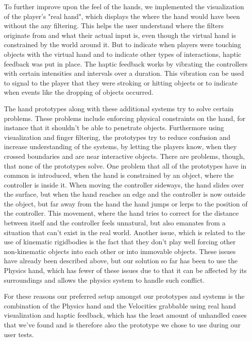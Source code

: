To further improve upon the feel of the hands, we implemented the visualization of the player's "real hand", which displays the where the hand would have been without the any filtering. This helps the user understand where the filters originate from and what their actual input is, even though the virtual hand is constrained by the world around it. But to indicate when players were touching objects with the virtual hand and to indicate other types of interactions, haptic feedback was put in place. The haptic feedback works by vibrating the controllers with certain intensities and intervals over a duration. This vibration can be used to signal to the player that they were stroking or hitting objects or to indicate when events like the dropping of objects occurred.

The hand prototypes along with these additional systems try to solve certain problems. These problems include enforcing physical constraints on the hand, for instance that it shouldn't be able to penetrate objects. Furthermore using visualization and finger filtering, the prototypes try to reduce confusion and increase understanding of the systems, by letting the players know, when they crossed boundaries and are near interactive objects. There are problems, though, that none of the prototypes solve. One problem that all of the prototypes have in common is introduced, when the hand is constrained by an object, where the controller is inside it. When moving the controller sideways, the hand slides over the surface, but when the hand reaches an edge and the controller is now outside the object, but far away from the hand the hand jumps or lerps to the position of the controller. This movement, where the hand tries to correct for the distance between itself and the controller feels unnatural, but also emanates from a situation that can't exist in the real world. Another issue, which is related to the use of kinematic rigidbodies is the fact that they don't play well forcing other non-kinematic objects into each other or into immovable objects. These issues have already been described above, but our solution so far has been to use the Physics hand, which has fewer of these issues due to that it can be affected by its surroundings and allows the physics system to handle such conflict.

For these reasons our preferred setup amongst our prototypes and systems is the combination of the Physics hand and the Velocities grabbable using real hand visualization and haptic feedback, which has the least amount of unhandled cases that we've found and is therefore also the prototype we chose to use during our user tests.